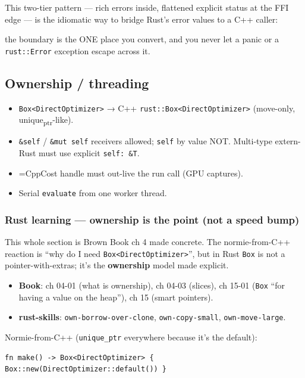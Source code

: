 \documentclass[11pt]{article}
\begin{document}
This two-tier pattern — rich errors inside, flattened explicit status at the
FFI edge — is the idiomatic way to bridge Rust's error values to a C++ caller:

the boundary is the ONE place you convert, and you never let a panic or a
\texttt{rust::Error} exception escape across it.
\subsection{Ownership / threading}
\label{sec:org2178209}

\begin{itemize}
\item \texttt{Box<DirectOptimizer>} → C++ \texttt{rust::Box<DirectOptimizer>} (move-only,
unique\textsubscript{ptr}-like).
\item \texttt{\&self} / \texttt{\&mut self} receivers allowed; \texttt{self} by value NOT. Multi-type
extern-Rust must use explicit \texttt{self: \&T}.
\item =CppCost handle must out-live the run call (GPU captures).
\item Serial \texttt{evaluate} from one worker thread.
\end{itemize}
\subsubsection{Rust learning — ownership is the point (not a speed bump)}
\label{sec:org0c05be1}

This whole section is Brown Book ch 4 made concrete. The normie-from-C++
reaction is ``why do I need \texttt{Box<DirectOptimizer>}'', but in Rust \texttt{Box} is not a
pointer-with-extras; it's the \textbf{ownership} model made explicit.

\begin{itemize}
\item \textbf{\textbf{Book}}: ch 04-01 (what is ownership), ch 04-03 (slices),
ch 15-01 (\texttt{Box} ``for having a value on the heap''), ch 15 (smart pointers).
\item \textbf{\textbf{rust-skills}}: \texttt{own-borrow-over-clone}, \texttt{own-copy-small}, \texttt{own-move-large}.
\end{itemize}

Normie-from-C++ (\texttt{unique\_ptr} everywhere because it's the default):

\begin{verbatim}
fn make() -> Box<DirectOptimizer> { Box::new(DirectOptimizer::default()) }
\end{verbatim}
\end{document}
